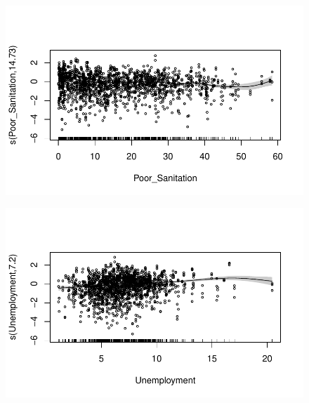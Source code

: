 \documentclass[
  letterpaper,
  DIV=11,
  numbers=noendperiod]{scrartcl}
\begin{document}
\begin{figure}[H]

{\centering \includegraphics{Group34Coursework_files/figure-pdf/unnamed-chunk-18-6.pdf}

}

\end{figure}

\begin{figure}[H]

{\centering \includegraphics{Group34Coursework_files/figure-pdf/unnamed-chunk-18-7.pdf}

}

\end{figure}
\end{document}
